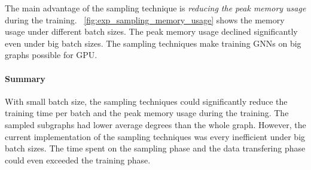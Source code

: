 The main advantage of the sampling technique is \emph{reducing the peak memory usage} during the training.
\figurename~\ref{fig:exp_sampling_memory_usage} shows the memory usage under different batch sizes.
The peak memory usage declined significantly even under big batch sizes.
The sampling techniques make training GNNs on big graphs possible for GPU.

\paragraph{Summary}
With small batch size, the sampling techniques could significantly reduce the training time per batch and the peak memory usage during the training.
The sampled subgraphs had lower average degrees than the whole graph.
However, the current implementation of the sampling techniques was every inefficient under big batch sizes.
The time spent on the sampling phase and the data transfering phase could even exceeded the training phase.